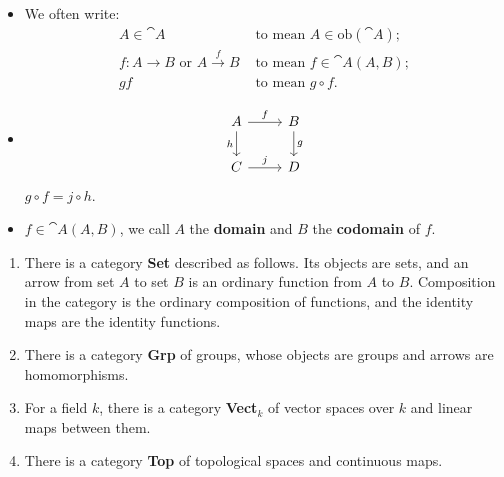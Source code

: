 \begin{remark}
    \begin{itemize}
        \item We often write:
            \begin{align*}
                A\in\cat{A} &\text{ to mean } A\in \text{ob}(\cat{A});\\
                f: A\to B \text{ or } A\xrightarrow{f}B &\text{ to mean } f\in \cat{A}(A,B);\\
                gf &\text{ to mean } g\circ f.
            \end{align*}
        \item {}
            \begin{equation*}
            \begin{tikzcd}
                A \arrow[r, "f"] \arrow[d, "h"'] & B \arrow[d, "g"] \\
                C \arrow[r, "j"] & D
            \end{tikzcd}
            \end{equation*}
             $g\circ f=j\circ h$.
        \item {} $f\in \cat{A}(A,B)$, we call $A$ the \textbf{domain} and $B$ the \textbf{codomain} of $f$.  
        
    \end{itemize}
\end{remark}

\begin{example}\leavevmode
    \begin{enumerate}[label=(\alph*)]
        \item There is a category \textbf{Set} described as follows. Its objects are sets, and an arrow from set $A$ to set $B$ is an ordinary function from $A$ to $B$. Composition in the category is the ordinary composition of functions, and the identity maps are the identity functions.
        \item There is a category \textbf{Grp} of groups, whose objects are groups and arrows are homomorphisms.
        \item For a field $k$, there is a category \textbf{Vect$_k$} of vector spaces over $k$ and linear maps between them.
        \item There is a category \textbf{Top} of topological spaces and continuous maps.
    \end{enumerate}
\end{example}

